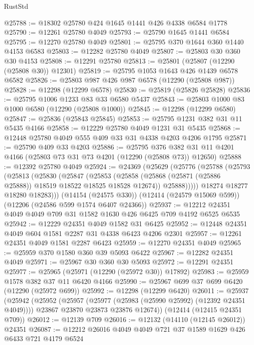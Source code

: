 \begin{lexlean}{RustStd}
\begin{coremodule}
{\begin{coremodule}
{{{{{{{{{{{{{{{{{{{{{{{{{{{{{{{{{{{{{{{{{{{{{{{{{{@25788 := @18302 @25780 @424 @1645 @1441 @426 @4338 @6584 @1778
@25790 := @12261 @25780 @4049
@25793 := @25790 @1645 @1441 @6584
@25795 := @12270 @25780 @4049
@25801 := @25795 @370 @1644 @360 @1440 @4153 @6583
@25803 := @12282 @25780 @4049
@25807 := @25803 @30 @360 @30 @4153
@25808 := @12291 @25780
@25813 := @25801 (@25807 (@12290 (@25808 @30)) @12301)
@25819 := @25795 @1053 @1643 @426 @1439 @6578 @6582
@25826 := @25803 @987 @426 @987 @6578 (@12290 (@25808 @987))
@25828 := @12298 (@12299 @6578)
@25830 := @25819 (@25826 @25828)
@25836 := @25795 @1006 @1233 @83 @33 @6580 @5437
@25843 := @25803 @1000 @83 @1000 @6580 (@12290 (@25808 @1000))
@25845 := @12298 (@12299 @6580)
@25847 := @25836 (@25843 @25845)
@25853 := @25795 @1231 @382 @31 @11 @5435 @4166
@25858 := @12229 @25780 @4049 @1231 @31 @5435
@25868 := @12448 @25780 @4049 @555 @409 @33 @31 @4338 @4203 @4206 @1795
@25871 := @25790 @409 @33 @4203
@25886 := @25795
    @376
    @382
    @31
    @11
    @4201
    @4166
    (@25803 @73 @31 @73 @4201 (@12290 (@25808 @73)) @12650)
@25888 := @12392 @25780 @4049
@25924 := @24369
    (@25629
      (@25776
        (@25788
          (@25793
            (@25813
              (@25830
                (@25847
                  (@25853
                    (@25858 (@25868 (@25871 (@25886 @25888)) @18519 @18522 @18525 @18528 @12674))
                    @25888)))))
          @18274
          @18277
          @18280
          @18283)))
    (@14154 (@24575 @330))
    (@12414 (@24579 @15069 @599))
    (@12206 (@24586 @599 @1574 @6407 @24366))
@25937 := @12212 @24351 @4049 @4049 @709 @31 @1582 @1630 @426 @6425 @709 @4192 @6525 @6535
@25942 := @12229 @24351 @4049 @1582 @31 @6425
@25952 := @12448 @24351 @4049 @604 @1581 @2287 @31 @4338 @6423 @4206 @2301
@25957 := @12261 @24351 @4049 @1581 @2287 @6423
@25959 := @12270 @24351 @4049
@25965 := @25959 @370 @1580 @360 @39 @5093 @6422
@25967 := @12282 @24351 @4049
@25971 := @25967 @30 @360 @30 @5093
@25972 := @12291 @24351
@25977 := @25965 (@25971 (@12290 (@25972 @30)) @17892)
@25983 := @25959 @1578 @382 @37 @11 @6420 @4166
@25990 := @25967 @699 @37 @699 @6420 (@12290 (@25972 @699))
@25992 := @12298 (@12299 @6420)
@26011 := @25937
    (@25942
      (@25952
        (@25957 (@25977 (@25983 (@25990 @25992) (@12392 @24351 @4049))))
        @23867
        @23870
        @23873
        @23876
        @12674))
    (@12414 (@12415 @24351 @709))
@26012 := @12139 @709
@26016 := @12132 (@14110 (@12145 @26012)) @24351
@26087 := @12212
    @26016
    @4049
    @4049
    @721
    @37
    @1589
    @1629
    @426
    @6433
    @721
    @4179
    @6524
}}}}}}}}}}}}}}}}}}}}}}}}}}}}}}}}}}}}}}}}}}}}}}}}}}
\end{coremodule}}
\end{coremodule}
\end{lexlean}
